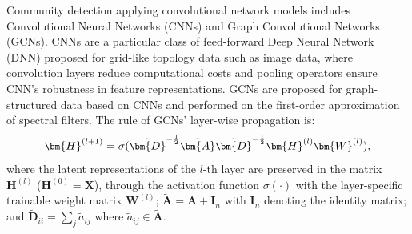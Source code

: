 \label{sec-model-cn}
Community detection applying convolutional network models includes Convolutional Neural Networks (CNNs) and Graph Convolutional Networks (GCNs). CNNs  are a particular class of feed-forward Deep Neural Network (DNN) proposed for grid-like topology data such as image data, where convolution layers reduce computational costs and pooling operators ensure CNN's robustness in feature representations. GCNs  are proposed for graph-structured data based on CNNs and performed on the first-order approximation of spectral filters. The rule of GCNs' layer-wise propagation is: 
\begin{equation}
\small
\label{equ-gcn}
\bm{H}^{(l+1)} = \sigma (\tilde{\bm{D}}^{-\frac{1}{2}} \tilde{\bm{A}} \tilde{\bm{D}}^{-\frac{1}{2}} \bm{H}^{(l)} \bm{W}^{(l)} ), 
\end{equation}
where the latent representations of the $l$-th layer are preserved in the matrix $\bm{H}^{(l)}$ ($\bm{H}^{(0)}=\bm{X}$), through the activation function $\sigma(\cdot)$ with the layer-specific trainable weight matrix $\bm{W}^{(l)}$; $\tilde{\bm{A}}=\bm{A}+\bm{I}_n$ with $\bm{I}_n$ denoting the identity matrix; and $\tilde{\bm{D}}_{ii}=\sum_j \tilde{a}_{ij}$ where $\tilde{a}_{ij} \in \tilde{\bm{A}}$.

